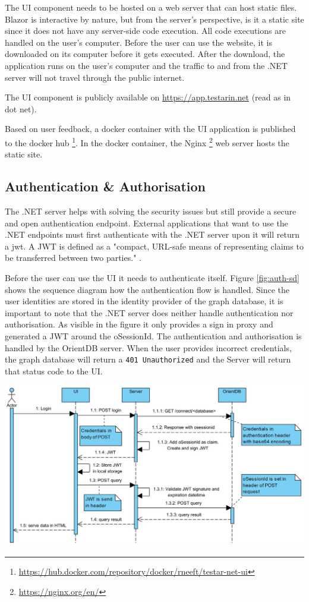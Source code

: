 The UI component needs to be hosted on a web server that can host static files. Blazor is interactive by nature, but from the server's perspective, is it a static site since it does not have any server-side code execution. All code executions are handled on the user's computer. Before the user can use the website, it is downloaded on its computer before it gets executed. After the download, the application runs on the user's computer and the traffic to and from the .NET server will not travel through the public internet. 

The UI component is publicly available on \url{https://app.testarin.net} (read as \testar in dot net). 

Based on user feedback, a docker container with the UI application is published to the docker hub \footnote{\url{https://hub.docker.com/repository/docker/rneeft/testar-net-ui}}. In the docker container, the Nginx \footnote{\url{https://nginx.org/en/}} web server hosts the static site.

\subsection{Authentication \& Authorisation}
The .NET server helps with solving the security issues but still provide a secure and open authentication endpoint. External applications that want to use the .NET endpoints must first authenticate with the .NET server upon it will return a \acrfull{jwt}. A JWT is defined as a "compact, URL-safe means of representing claims to be transferred between two parties." \cite{jones2015json}.

Before the user can use the UI it needs to authenticate itself. Figure \ref{fig:auth-sd} shows the sequence diagram how the authentication flow is handled. Since the user identities are stored in the identity provider of the graph database, it is important to note that the .NET server does neither handle authentication nor authorisation. As visible in the figure it only provides a sign in proxy and generated a JWT around the oSessionId. The authentication and authorisation is handled by the OrientDB server. When the user provides incorrect credentials, the graph database will return a \verb|401 Unauthorized| and the Server will return that status code to the UI.

\begingroup
\captionsetup{type=figure}
\includegraphics[scale=0.4]{thesis/images/authentication-sd.png}
\label{fig:auth-sd}
\endgroup

